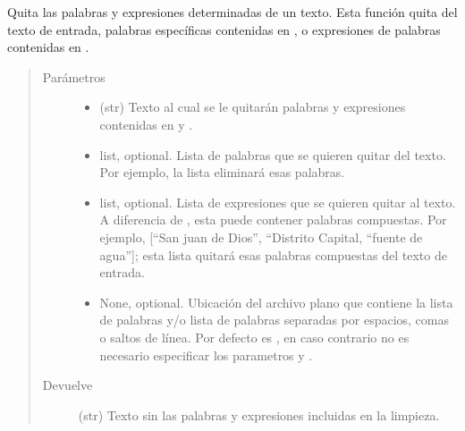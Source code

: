 \documentclass[letterpaper,10pt,openany,spanish]{sphinxmanual}
\begin{document}
\begin{fulllineitems}
\label{\detokenize{funciones/limpieza:limpieza.remover_stopwords}}
Quita las palabras y expresiones determinadas de un texto. Esta función quita del texto de entrada,     palabras específicas contenidas en , o expresiones de palabras contenidas en .
\begin{quote}\begin{description}
\item[{Parámetros}] \leavevmode\begin{itemize}
\item {} 
 \textendash{} (str) Texto al cual se le quitarán palabras y expresiones contenidas en      y .

\item {} 
 \textendash{} list, optional. Lista de palabras que se quieren quitar del texto. Por ejemplo,         la lista \sphinxtitleref{{[}“hola”, “de”, “a”{]}} eliminará esas palabras.

\item {} 
 \textendash{} list, optional. Lista de expresiones que se quieren quitar al texto.         A diferencia de , esta puede contener palabras compuestas. Por ejemplo,         {[}“San juan de Dios”, “Distrito Capital, “fuente de agua”{]}; esta lista quitará esas palabras         compuestas del texto de entrada.

\item {} 
 \textendash{} None, optional. Ubicación del archivo plano que contiene la lista de palabras         y/o lista de palabras separadas por espacios, comas o saltos de línea. Por defecto es , en         caso contrario no es necesario especificar los parametros  y .

\end{itemize}

\item[{Devuelve}] \leavevmode
(str) Texto sin las palabras y expresiones incluidas en la limpieza.

\end{description}\end{quote}

\end{fulllineitems}
\end{document}
